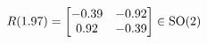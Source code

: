 \documentclass[preview]{standalone}
\begin{document}
\begin{align*}
\special{dvisvgm:raw <g id='unique000'>}R(1.97) = \begin{bmatrix} -0.39 & -0.92 \\ 0.92 & -0.39 \end{bmatrix} \in \text{SO}(2)\special{dvisvgm:raw </g>}
\end{align*}
\end{document}
